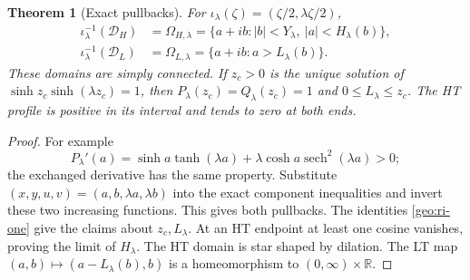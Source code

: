 \documentclass[11pt]{article}
\numberwithin{equation}{section}
\newtheorem{theorem}{Theorem}[section]
\theoremstyle{definition}
\begin{document}
\begin{theorem}[Exact pullbacks]\label{geo:exact-pullbacks}
For $\iota_\lambda(\zeta)=(\zeta/2,\lambda\zeta/2)$,
\begin{align}
 \iota_\lambda^{-1}(\mathcal D_H)
 &=\Omega_{H,\lambda}=\{a+ib:|b|<Y_\lambda,\ |a|<H_\lambda(b)\},
 \label{geo:HT-pullback}\\
 \iota_\lambda^{-1}(\mathcal D_L)
 &=\Omega_{L,\lambda}=\{a+ib:a>L_\lambda(b)\}.
 \label{geo:LT-pullback}
\end{align}
These domains are simply connected.  If $z_c>0$ is the unique solution
of $\sinh z_c\sinh(\lambda z_c)=1$, then
$P_\lambda(z_c)=Q_\lambda(z_c)=1$ and $0\le L_\lambda\le z_c$.
The HT profile is positive in its interval and tends to zero at both ends.
\end{theorem}
\begin{proof}
For example
\[
 P_\lambda'(a)=\sinh a\tanh(\lambda a)+\lambda\cosh a\operatorname{sech}^2(\lambda a)>0;
\]
the exchanged derivative has the same property.  Substitute
$(x,y,u,v)=(a,b,\lambda a,\lambda b)$ into the exact component
inequalities and invert these two increasing functions.  This gives
both pullbacks.  The identities \eqref{geo:ri-one} give the claims
about $z_c,L_\lambda$.  At an HT endpoint at least one cosine
vanishes, proving the limit of $H_\lambda$.  The HT domain is star
shaped by dilation.  The LT map $(a,b)\mapsto(a-L_\lambda(b),b)$
is a homeomorphism to $(0,\infty)\times\mathbb R$.
\end{proof}
\end{document}
